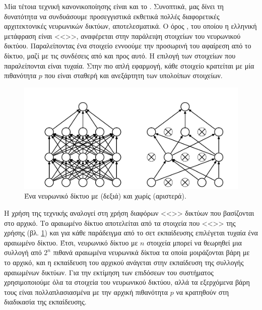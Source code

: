 Μία τέτοια τεχνική κανονικοποίησης είναι και το .
Συνοπτικά, μας δίνει τη δυνατότητα να συνδυάσουμε προσεγγιστικά εκθετικά πολλές διαφορετικές αρχιτεκτονικές νευρωνικών δικτύων, αποτελεσματικά.
Ο όρος , του οποίου η ελληνική μετάφραση είναι <<>>, αναφέρεται στην παράλειψη στοιχείων του νευρωνικού δικτύου.
Παραλείποντας ένα στοιχείο εννοούμε την προσωρινή του αφαίρεση από το δίκτυο, μαζί με τις συνδέσεις από και προς αυτό.
Η επιλογή των στοιχείων που παραλείπονται είναι τυχαία.
Στην πιο απλή εφαρμογή, κάθε στοιχείο κρατείται με μία πιθανότητα $p$ που είναι σταθερή και ανεξάρτητη των υπολοίπων στοιχείων.

\begin{figure}[tph]
	\includegraphics[width=\textwidth, keepaspectratio]{images/dropout.png}
	\centering 
	\caption{Ένα νευρωνικό δίκτυο με  (δεξιά) και χωρίς (αριστερά).}
	\label{fig:dropout}
\end{figure}

Η χρήση της τεχνικής  αναλογεί στη χρήση διαφόρων <<>> δικτύων που βασίζονται στο αρχικό.
Το αραιωμένο δίκτυο αποτελείται από τα στοιχεία που <<>> της χρήσης  (βλ. \ref{fig:dropout}) και για κάθε παράδειγμα από το σετ εκπαίδευσης επιλέγεται τυχαία ένα αραιωμένο δίκτυο.
Έτσι, νευρωνικό δίκτυο με $n$ στοιχεία μπορεί να θεωρηθεί μια συλλογή από $2^n$ πιθανά αραιωμένα νευρωνικά δίκτυα τα οποία μοιράζονται βάρη με το αρχικό, και η εκπαίδευση του αρχικού ανάγεται στην εκπαίδευση της συλλογής αραιωμένων δικτύων. 
Για την εκτίμηση των επιδόσεων του συστήματος χρησιμοποιούμε όλα τα στοιχεία του νευρωνικού δικτύου, αλλά τα εξερχόμενα βάρη τους είναι πολλαπλασιασμένα με την αρχική πιθανότητα $p$ να κρατηθούν στη διαδικασία της εκπαίδευσης.